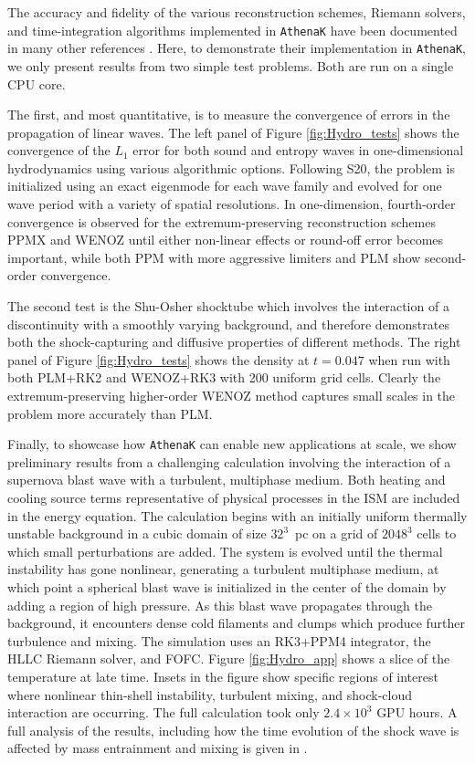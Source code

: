 \documentclass[twocolumn, floatfix]{aastex63}
\newcommand{\ak}{\texttt{AthenaK}}
\begin{document}
The accuracy and fidelity of the various reconstruction schemes, Riemann solvers, and time-integration algorithms implemented in \ak{} have been documented in many other references \citep[e.g. S20,][]{toro2013riemann}.  Here, to demonstrate their implementation in \ak{}, we only present results from two simple test problems.  Both are run on a single CPU core.

The first, and most quantitative, is to measure the convergence of errors in the propagation of linear waves.  The left panel of Figure \ref{fig:Hydro_tests} shows the convergence of the $L_1$ error for both sound and entropy waves in one-dimensional hydrodynamics using various algorithmic options.  Following S20, the problem is initialized using an exact eigenmode for each wave family and evolved for one wave period with a variety of spatial resolutions.  In one-dimension, fourth-order convergence is observed for the extremum-preserving reconstruction schemes PPMX and WENOZ until either non-linear effects or round-off error becomes important, while both PPM with more aggressive limiters and PLM show second-order convergence.

The second test is the Shu-Osher shocktube \citep{shu1989JCoPh..83...32S} which involves the interaction of a discontinuity with a smoothly varying background, and therefore demonstrates both the shock-capturing and diffusive properties of different methods. The right panel of Figure \ref{fig:Hydro_tests} shows the density at $t=0.047$ when run with both PLM+RK2 and WENOZ+RK3 with 200 uniform grid cells.  Clearly the extremum-preserving higher-order WENOZ method captures small scales in the problem more accurately than PLM.

Finally, to showcase how \ak{} can enable new applications at scale, we show preliminary results from a challenging calculation involving the interaction of a supernova blast wave with a turbulent, multiphase medium. Both heating and cooling source terms representative of physical processes in the ISM \citep{Schneider2018ApJ...860..135S} are included in the energy equation. The calculation begins with an initially uniform thermally unstable background in a cubic domain of size $32^3$~pc on a grid of $2048^3$ cells to which small perturbations are added. The system is evolved until the thermal instability has gone nonlinear, generating a turbulent multiphase medium, at which point a spherical blast wave is initialized in the center of the domain by adding a region of high pressure. As this blast wave propagates through the background, it encounters dense cold filaments and clumps which produce further turbulence and mixing. The simulation uses an RK3+PPM4 integrator, the HLLC Riemann solver, and FOFC. Figure \ref{fig:Hydro_app} shows a slice of the temperature at late time. Insets in the figure show specific regions of interest where nonlinear thin-shell instability, turbulent mixing, and shock-cloud interaction are occurring. The full calculation took only $2.4\times10^3$ GPU hours. A full analysis of the results, including how the time evolution of the shock wave is affected by mass entrainment and mixing is given in \cite{Guo.9.24}.
\end{document}
